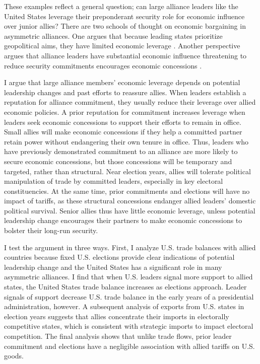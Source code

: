 \documentclass[12pt]{article}
\begin{document}
These examples reflect a general question; can large alliance leaders like the United States leverage their preponderant security role for economic influence over junior allies? 
There are two schools of thought on economic bargaining in asymmetric alliances. 
One argues that because leading states prioritize geopolitical aims, they have limited economic leverage \citep{Drezner2013, WolfordKim2017}.
Another perspective argues that alliance leaders have substantial economic influence \cite{Norrlof2010, Brooksetal2013} threatening to reduce security commitments encourages economic concessions \citep[pg. 122]{Oatley2015}. 


I argue that large alliance members' economic leverage depends on potential leadership changes and past efforts to reassure allies.
When leaders establish a reputation for alliance commitment, they usually reduce their leverage over allied economic policies. 
A prior reputation for commitment increases leverage when leaders seek economic concessions to support their efforts to remain in office. 
Small allies will make economic concessions if they help a committed partner retain power without endangering their own tenure in office.  
Thus, leaders who have previously demonstrated commitment to an alliance are more likely to secure economic concessions, but those concessions will be temporary and targeted, rather than structural.
Near election years, allies will tolerate political manipulation of trade by committed leaders, especially in key electoral constituencies. 
At the same time, prior commitments and elections will have no impact of tariffs, as these structural concessions endanger allied leaders' domestic political survival. 
Senior allies thus have little economic leverage, unless potential leadership change encourages their partners to make economic concessions to bolster their long-run security. 


I test the argument in three ways.
First, I analyze U.S. trade balances with allied countries because fixed U.S. elections provide clear indications of potential leadership change and the United States has a significant role in many asymmetric alliances. 
I find that when U.S. leaders signal more support to allied states, the United States trade balance increases as elections approach. 
Leader signals of support decrease U.S. trade balance in the early years of a presidential administration, however. 
A subsequent analysis of exports from U.S. states in election years suggests that allies concentrate their imports in electorally competitive states, which is consistent with strategic imports to impact electoral competition.
The final analysis shows that unlike trade flows, prior leader commitment and elections have a negligible association with allied tariffs on U.S. goods. 
\end{document}
